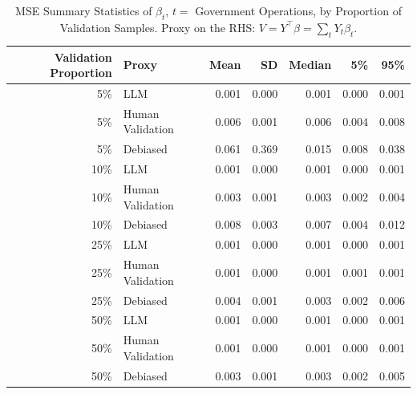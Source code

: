 \begin{table}

\caption{\label{tab:unnamed-chunk-1}MSE Summary Statistics of $\beta_{t}$, $t=$ Government Operations, by Proportion of Validation Samples.
      Proxy on the RHS: $V = Y^\top \beta = \sum_{t} Y_t \beta_t$.}
\centering
\begin{tabular}[t]{rlrrrrr}
\toprule
Validation Proportion & Proxy & Mean & SD & Median & 5\% & 95\%\\
\midrule
5\% & LLM & 0.001 & 0.000 & 0.001 & 0.000 & 0.001\\
5\% & Human Validation & 0.006 & 0.001 & 0.006 & 0.004 & 0.008\\
5\% & Debiased & 0.061 & 0.369 & 0.015 & 0.008 & 0.038\\
10\% & LLM & 0.001 & 0.000 & 0.001 & 0.000 & 0.001\\
10\% & Human Validation & 0.003 & 0.001 & 0.003 & 0.002 & 0.004\\
10\% & Debiased & 0.008 & 0.003 & 0.007 & 0.004 & 0.012\\
25\% & LLM & 0.001 & 0.000 & 0.001 & 0.000 & 0.001\\
25\% & Human Validation & 0.001 & 0.000 & 0.001 & 0.001 & 0.001\\
25\% & Debiased & 0.004 & 0.001 & 0.003 & 0.002 & 0.006\\
50\% & LLM & 0.001 & 0.000 & 0.001 & 0.000 & 0.001\\
50\% & Human Validation & 0.001 & 0.000 & 0.001 & 0.000 & 0.001\\
50\% & Debiased & 0.003 & 0.001 & 0.003 & 0.002 & 0.005\\
\bottomrule
\end{tabular}
\end{table}
